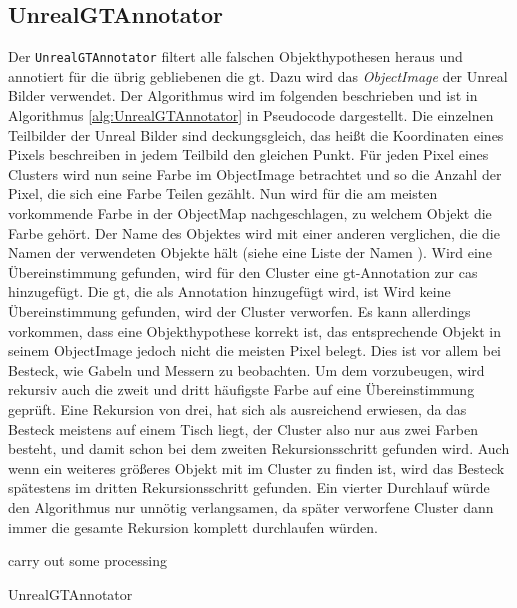 \subsection{UnrealGTAnnotator}
Der \texttt{UnrealGTAnnotator} filtert alle falschen Objekthypothesen heraus und annotiert für die übrig gebliebenen die \gls{gt}. Dazu wird das \textit{ObjectImage} der Unreal Bilder verwendet. Der Algorithmus wird im folgenden beschrieben und ist in Algorithmus \ref{alg:UnrealGTAnnotator} in Pseudocode dargestellt. Die einzelnen Teilbilder der Unreal Bilder sind deckungsgleich, das heißt die Koordinaten eines Pixels beschreiben in jedem Teilbild den gleichen Punkt. Für jeden Pixel eines Clusters wird nun seine Farbe im ObjectImage betrachtet und so die Anzahl der Pixel, die sich eine Farbe Teilen gezählt. Nun wird für die am meisten vorkommende Farbe in der ObjectMap nachgeschlagen, zu welchem Objekt die Farbe gehört. Der Name des Objektes wird mit einer anderen  verglichen, die die Namen der verwendeten Objekte hält (siehe eine Liste der Namen ). Wird eine Übereinstimmung gefunden, wird für den Cluster eine \gls{gt}-Annotation zur \gls{cas} hinzugefügt. Die \gls{gt}, die als Annotation hinzugefügt wird, ist  Wird keine Übereinstimmung gefunden, wird der Cluster verworfen. Es kann allerdings vorkommen, dass eine Objekthypothese korrekt ist, das entsprechende Objekt in seinem ObjectImage jedoch nicht die meisten Pixel belegt. Dies ist vor allem bei Besteck, wie Gabeln und Messern zu beobachten. Um dem vorzubeugen, wird rekursiv auch die zweit und dritt häufigste Farbe auf eine Übereinstimmung geprüft. Eine Rekursion von drei, hat sich als ausreichend erwiesen, da das Besteck meistens auf einem Tisch liegt, der Cluster also nur aus zwei Farben besteht, und damit schon bei dem zweiten Rekursionsschritt gefunden wird. Auch wenn ein weiteres größeres Objekt mit im Cluster zu finden ist, wird das Besteck spätestens im dritten Rekursionsschritt gefunden. Ein vierter Durchlauf würde den Algorithmus nur unnötig verlangsamen, da später verworfene Cluster dann immer die gesamte Rekursion komplett durchlaufen würden. 

\begin{algorithm}[H]
\begin{algorithmic}
\STATE carry out some processing
\ENDFOR
\end{algorithmic}
\caption{UnrealGTAnnotator}
\label{alg:UnrealGTAnnotator}
\end{algorithm}


